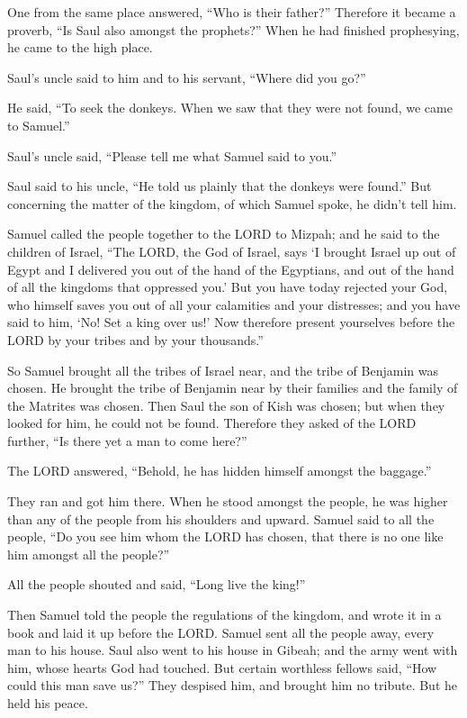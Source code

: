  One from the same place answered, ``Who is their father?''
Therefore it became a proverb, ``Is Saul also amongst the prophets?''
 When he had finished prophesying, he came to the high
place.

 Saul's uncle said to him and to his servant, ``Where did
you go?''

He said, ``To seek the donkeys. When we saw that they were not found, we
came to Samuel.''

 Saul's uncle said, ``Please tell me what Samuel said to
you.''

 Saul said to his uncle, ``He told us plainly that the
donkeys were found.'' But concerning the matter of the kingdom, of which
Samuel spoke, he didn't tell him.

 Samuel called the people together to the LORD to Mizpah;
 and he said to the children of Israel, ``The LORD, the God
of Israel, says `I brought Israel up out of Egypt and I delivered you
out of the hand of the Egyptians, and out of the hand of all the
kingdoms that oppressed you.'  But you have today rejected
your God, who himself saves you out of all your calamities and your
distresses; and you have said to him, `No! Set a king over us!' Now
therefore present yourselves before the LORD by your tribes and by your
thousands.''

 So Samuel brought all the tribes of Israel near, and the
tribe of Benjamin was chosen.  He brought the tribe of
Benjamin near by their families and the family of the Matrites was
chosen. Then Saul the son of Kish was chosen; but when they looked for
him, he could not be found.  Therefore they asked of the
LORD further, ``Is there yet a man to come here?''

The LORD answered, ``Behold, he has hidden himself amongst the
baggage.''

 They ran and got him there. When he stood amongst the
people, he was higher than any of the people from his shoulders and
upward.  Samuel said to all the people, ``Do you see him
whom the LORD has chosen, that there is no one like him amongst all the
people?''

All the people shouted and said, ``Long live the king!''

 Then Samuel told the people the regulations of the
kingdom, and wrote it in a book and laid it up before the LORD. Samuel
sent all the people away, every man to his house.  Saul
also went to his house in Gibeah; and the army went with him, whose
hearts God had touched.  But certain worthless fellows
said, ``How could this man save us?'' They despised him, and brought him
no tribute. But he held his peace.

